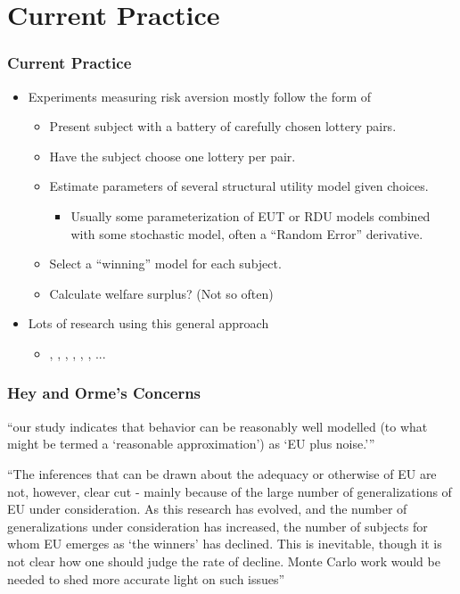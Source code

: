 \documentclass{beamer}
\begin{document}
\section{Current Practice}

\begin{frame}
\frametitle{Current Practice}
\begin{itemize}
	\item Experiments measuring risk aversion mostly follow the form of \textcite{Hey1994}
		\begin{itemize}
			\item Present subject with a battery of carefully chosen lottery pairs.
			\item Have the subject choose one lottery per pair.
			\item Estimate parameters of several structural utility model given choices.
				\begin{itemize}
					\item Usually some parameterization of EUT or RDU models combined with some stochastic model, often a \enquote{Random Error} derivative.
				\end{itemize}
			\item Select a \enquote{winning} model for each subject.
			\item Calculate welfare surplus? (Not so often)
		\end{itemize}
	\item Lots of research using this general approach
		\begin{itemize}
			\item \textcite{Hey1994, Hey1995, Hey2001}, \textcite{Loomes1995, Loomes1998}, \textcite{Conte2011}, \textcite{Harrison2005}, \textcite{Harrison2005a}, \textcite{Harrison2008}, \textcite{Harrison2016} ...
		\end{itemize}
\end{itemize}
\end{frame}

\begin{frame}
\frametitle{Hey and Orme's Concerns}

\enquote{\textelp{}our study indicates that behavior can be reasonably well modelled (to what might be termed a \enquote{reasonable approximation}) as \enquote{EU plus noise.}}

\hfill \break

\enquote{The inferences that can be drawn \textelp{} about the adequacy or otherwise of EU are not, however, clear cut - mainly because of the large number of generalizations of EU under consideration.
As this research has evolved, and the number of generalizations under consideration has increased, the number of subjects for whom EU emerges as \enquote{the winners} has declined. 
This is inevitable, though it is not clear how one should judge the rate of decline.
\textelp{} Monte Carlo work would be needed to shed more accurate light on such issues}
\end{frame}
\end{document}
